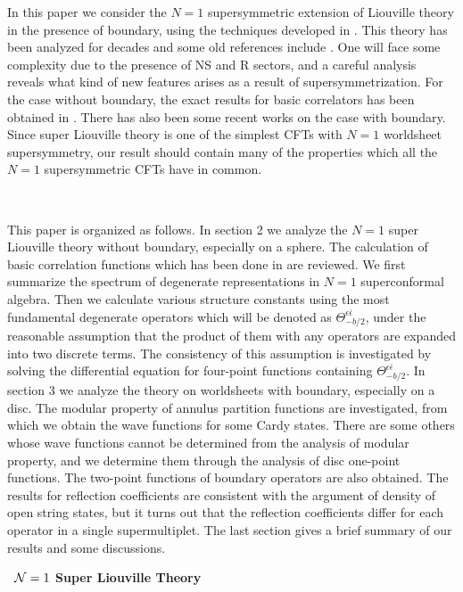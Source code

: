 \documentclass[a4paper,12pt]{article}
\def\section#1{
    \addtocounter{section}{1}\setcounter{subsection}{0}\setcounter{equation}{0}
    \vskip8mm\begin{center}{\bf\thesection~#1}\end{center}}
\newcommand{\ep}{{\epsilon}}
\newcommand{\bep}{{\bar{\epsilon}}}
\begin{document}
   In this paper we consider the $N=1$ supersymmetric extension
 of Liouville theory in the presence of boundary,
 using the techniques developed in \cite{FZZ,ZZ}.
 This theory has been analyzed for decades and some old references
 include \cite{Arvis,DHoker,Babelon,ZP,ACDH,dFK,AD,DA}.
 One will face some complexity due to the presence of
 NS and R sectors, and a careful analysis reveals
 what kind of new features arises as a result
 of supersymmetrization.
 For the case without boundary, the exact results for basic correlators
 has been obtained in \cite{Poghosian, RS}.
 There has also been some recent works on the case with boundary\cite{ARS}.
 Since super Liouville theory is one of the simplest CFTs
 with $N=1$ worldsheet supersymmetry, our result should contain
 many of the properties which all the $N=1$ supersymmetric
 CFTs have in common.

~

   This paper is organized as follows.
 In section 2 we analyze the $N=1$ super Liouville theory without
 boundary, especially on a sphere.
 The calculation of basic correlation functions which has been done
 in  \cite{Poghosian,RS} are reviewed.
 We first summarize the spectrum of degenerate representations
 in $N=1$ superconformal algebra.
 Then we calculate various structure constants using the most
 fundamental degenerate operators which will be denoted as
 $\Theta_{-b/2}^{\ep\bep}$, under the reasonable assumption
 that the product of them with any operators are expanded
 into two discrete terms.
 The consistency of this assumption is investigated by solving
 the differential equation for four-point functions containing
 $\Theta_{-b/2}^{\ep\bep}$.
 In section 3 we analyze the theory on worldsheets with boundary,
 especially on a disc.
 The modular property of annulus partition functions are investigated,
 from which we obtain the wave functions for some Cardy states.
 There are some others whose wave functions cannot be determined from
 the analysis of modular property, and we determine them
 through the analysis of disc one-point functions.
 The two-point functions of boundary operators are also obtained.
 The results for reflection coefficients are consistent with the 
 argument of density of open string states, but it turns out
 that the reflection coefficients differ for each operator in a
 single supermultiplet.
 The last section gives a brief summary of our results and some
 discussions.

\section{${\cal N}=1$ Super Liouville Theory}%
\end{document}
